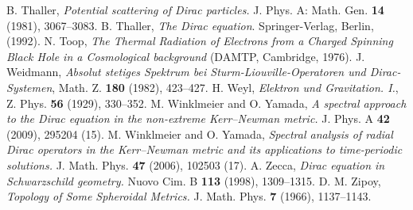\documentclass[11 pt]{article}
\renewcommand\({\left(}
\renewcommand\){\right)}
\newcommand\<{\langle}
\renewcommand\>{\rangle}
\newcommand\8{\infty}
\begin{document}
\begin{thebibliography}{10}
  B. Thaller, 
  \textit{Potential scattering of {D}irac particles.}
         {J. Phys. A: Math. Gen.} \textbf{14} ({1981}), {3067--3083}.
  B. Thaller, 
  \textit{The {D}irac equation}.
  {Springer-Verlag}, {Berlin}, ({1992}).
  N. Toop, \textit{The Thermal Radiation of Electrons from a Charged Spinning Black Hole in a Cosmological background} (DAMTP,
Cambridge, 1976).
 J. Weidmann,
  \textit{Absolut stetiges {S}pektrum bei {S}turm-{L}iouville-{O}peratoren und {D}irac-{S}ystemen},
         {Math. Z.} \textbf{180} ({1982}), {423--427}.
 H. Weyl, \textit{Elektron und Gravitation. I.},
  {Z. Phys.} \textbf{56} ({1929}), {330--352}. 
  M. Winklmeier and O. Yamada,
  \textit{A spectral approach to the {D}irac equation in the non-extreme {K}err--{N}ewman metric.}
  {J. Phys. A} \textbf{42} (2009), 295204 (15).
  M. Winklmeier and O. Yamada,
  \textit{Spectral analysis of radial {D}irac operators in the {K}err--{N}ewman metric 
    and its applications to time-periodic solutions.}
   {J. Math. Phys.} \textbf{47} (2006), 102503 (17).
  A. Zecca, 
  \textit{Dirac equation in Schwarzschild geometry.}
         {Nuovo Cim. B} \textbf{113} (1998), 1309--1315.
  D. M. Zipoy,
  \textit{Topology of Some Spheroidal Metrics.}
         {J. Math. Phys.} \textbf{7} (1966), {1137--1143}.
\end{thebibliography}
\end{document}
